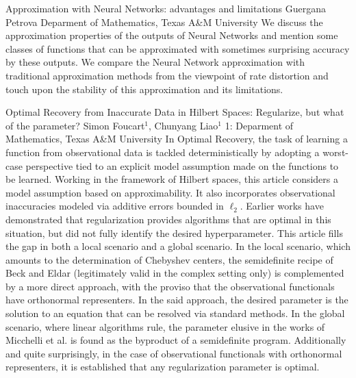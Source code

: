 \begin{addmargin}[2em]{0em}
\vspace{1.5ex}
\abs
{Approximation with Neural Networks: advantages and limitations}
{Guergana Petrova}
{Deparment of Mathematics, Texas A\&M University}
{We discuss  the approximation properties of the outputs of Neural Networks and mention some classes of functions  that can be approximated with sometimes surprising accuracy by these outputs. We compare the Neural Network approximation  with traditional approximation methods from the viewpoint of rate distortion and touch upon the stability of this approximation and its limitations.}


\vspace{1.5ex}
\abs
{Optimal Recovery from Inaccurate Data in Hilbert Spaces: Regularize, but what of the parameter?}
{Simon Foucart$^1$, Chunyang Liao$^1$}
{1: Deparment of Mathematics, Texas A\&M University}
{In Optimal Recovery, the task of learning a function from observational data is tackled deterministically by adopting a worst-case perspective tied to an explicit model assumption made on the functions to be learned. Working in the framework of Hilbert spaces, this article considers a model assumption based on approximability. It also incorporates observational inaccuracies modeled via additive errors bounded in $\ell_2$. Earlier works have demonstrated that regularization provides algorithms that are optimal in this situation, but did not fully identify the desired hyperparameter. This article fills the gap in both a local scenario and a global scenario. In the local scenario, which amounts to the determination of Chebyshev centers, the semidefinite recipe of Beck and Eldar (legitimately valid in the complex setting only) is complemented by a more direct approach, with the proviso that the observational functionals have orthonormal representers. In the said approach, the desired parameter is the solution to an equation that can be resolved via standard methods. In the global scenario, where linear algorithms rule, the parameter elusive in the works of Micchelli et al. is found as the byproduct of a semidefinite program. Additionally and quite surprisingly, in the case of observational functionals with orthonormal representers, it is established that any regularization parameter is optimal.}



\end{addmargin}
